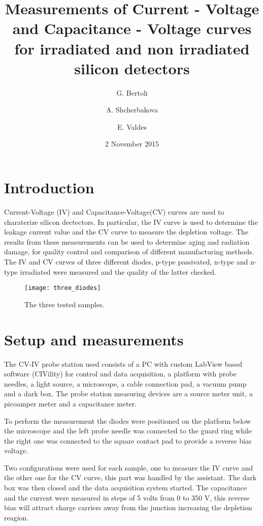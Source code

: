 \documentclass[a4paper, 10pt, notitlepage]{article}
\author{G. Bertoli \and A. Shcherbakova \and E. Valdes}
\title{Measurements of Current - Voltage and Capacitance - Voltage curves for
  irradiated and non irradiated silicon detectors}
\date{2 November 2015}
\begin{document}
\maketitle

\section{Introduction}
\label{sec:intro}

Current-Voltage (IV) and Capacitance-Voltage(CV) curves are used to charaterize
silicon dectectors. In particular, the IV curve is used to determine the leakage
current value and the CV curve to measure the depletion voltage. The results
from these measurements can be used to determine aging and radiation damage, for
quality control and comparison of different manufacturing methods. The IV and CV
curves of three different diodes, p-type passivated, n-type and n-type
irradiated were measured and the quality of the latter checked.

\begin{figure}[!h]
  \centering
  \texttt{[image: three\_diodes]}
    \caption{The three tested samples.}
  \label{fig:three_diodes}
\end{figure}
\section{Setup and measurements}
\label{sec:setup}

The CV-IV probe station used consists of a PC with custom LabView based software
(CIVility) for control and data acquisition, a platform with probe needles, a
light source, a microscope, a cable connection pad, a vacuum pump and a dark
box. The probe station measuring devices are a source meter unit, a picoamper
meter and a capacitance meter.

To perform the measurement the diodes were positioned on the platform below the
microscope and the left probe needle was connected to the guard ring while the
right one was connected to the square contact pad to provide a reverse bias
voltage.

Two configurations were used for each sample, one to measure the IV curve and
the other one for the CV curve, this part was handled by the assistant. The dark
box was then closed and the data acquisition system started. The capacitance and
the current were measured in steps of 5 volts from 0 to 350 V, this reverse bias
will attract charge carriers away from the junction increasing the depletion
reagion.
\end{document}
